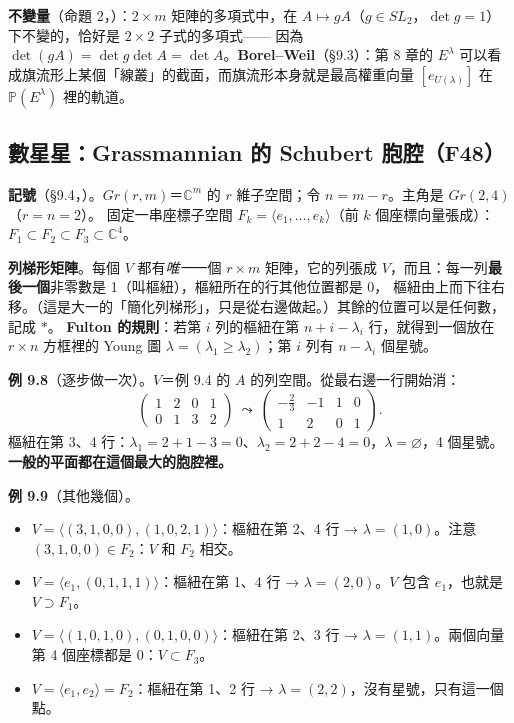 \begin{notebox}
\textbf{不變量}（命題 2，）：$2\times m$ 矩陣的多項式中，在 $A\mapsto gA$（$g\in SL_2$，$\det g=1$）下不變的，恰好是 $2\times2$ 子式的多項式——
因為 $\det(gA)=\det g\det A=\det A$。\textbf{Borel–Weil}（\S9.3）：第 8 章的 $E^\lambda$ 可以看成旗流形上某個「線叢」的截面，而旗流形本身就是最高權重向量 $[e_{U(\lambda)}]$ 在 $\mathbb P(E^\lambda)$ 裡的軌道。
\end{notebox}

\subsection{數星星：Grassmannian 的 Schubert 胞腔（F48）}\label{sec:f-grasscells}

\textbf{記號}（\S9.4，）。$Gr(r,m)$＝$\mathbb C^m$ 的 $r$ 維子空間；令 $n=m-r$。主角是 $Gr(2,4)$（$r=n=2$）。
固定一串座標子空間 $F_k=\langle e_1,\dots,e_k\rangle$（前 $k$ 個座標向量張成）：$F_1\subset F_2\subset F_3\subset\mathbb C^4$。

\textbf{列梯形矩陣}。每個 $V$ 都有\emph{唯一}一個 $r\times m$ 矩陣，它的列張成 $V$，而且：每一列\textbf{最後一個}非零數是 1（叫樞紐），樞紐所在的行其他位置都是 0，
樞紐由上而下往右移。（這是大一的「簡化列梯形」，只是從右邊做起。）其餘的位置可以是任何數，記成 $\ast$。
\textbf{Fulton 的規則}：若第 $i$ 列的樞紐在第 $n+i-\lambda_i$ 行，就得到一個放在 $r\times n$ 方框裡的 Young 圖 $\lambda=(\lambda_1\ge\lambda_2)$；第 $i$ 列有 $n-\lambda_i$ 個星號。

\textbf{例 9.8}（逐步做一次）。$V$＝例 9.4 的 $A$ 的列空間。從最右邊一行開始消：
\[
\begin{pmatrix}1&2&0&1\\0&1&3&2\end{pmatrix}\ \leadsto\ \begin{pmatrix}-\tfrac23&-1&1&0\\1&2&0&1\end{pmatrix}.
\]
樞紐在第 3、4 行：$\lambda_1=2+1-3=0$、$\lambda_2=2+2-4=0$，$\lambda=\varnothing$，4 個星號。\textbf{一般的平面都在這個最大的胞腔裡。}

\textbf{例 9.9}（其他幾個）。
\begin{itemize}[nosep]
\item $V=\langle(3,1,0,0),(1,0,2,1)\rangle$：樞紐在第 2、4 行 → $\lambda=(1,0)$。注意 $(3,1,0,0)\in F_2$：$V$ 和 $F_2$ 相交。
\item $V=\langle e_1,(0,1,1,1)\rangle$：樞紐在第 1、4 行 → $\lambda=(2,0)$。$V$ 包含 $e_1$，也就是 $V\supset F_1$。
\item $V=\langle(1,0,1,0),(0,1,0,0)\rangle$：樞紐在第 2、3 行 → $\lambda=(1,1)$。兩個向量第 4 個座標都是 0：$V\subset F_3$。
\item $V=\langle e_1,e_2\rangle=F_2$：樞紐在第 1、2 行 → $\lambda=(2,2)$，沒有星號，只有這一個點。
\end{itemize}

